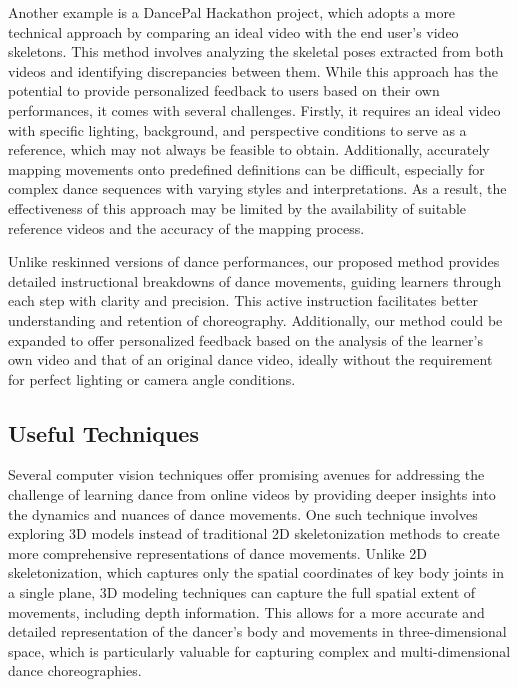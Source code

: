 Another example is a DancePal Hackathon project, which adopts a more technical approach by 
comparing an ideal video with the end user's video skeletons. \cite{Authors14c} This method involves analyzing the 
skeletal poses extracted from both videos and identifying discrepancies between them. While this 
approach has the potential to provide personalized feedback to users based on their own performances, 
it comes with several challenges. Firstly, it requires an ideal video with specific lighting, 
background, and perspective conditions to serve as a reference, which may not always be feasible 
to obtain. Additionally, accurately mapping movements onto predefined definitions can be difficult, 
especially for complex dance sequences with varying styles and interpretations. As a result, the 
effectiveness of this approach may be limited by the availability of suitable reference videos and 
the accuracy of the mapping process.

Unlike reskinned versions of dance performances, our proposed method provides detailed instructional 
breakdowns of dance movements, guiding learners through each step with clarity and precision. This 
active instruction facilitates better understanding and retention of choreography. Additionally, our 
method could be expanded to offer personalized feedback based on the analysis of the learner's own 
video and that of an original dance video, ideally without the requirement for perfect lighting or 
camera angle conditions.


\subsection{Useful Techniques}
Several computer vision techniques offer promising avenues for addressing the challenge of learning 
dance from online videos by providing deeper insights into the dynamics and nuances of dance 
movements. One such technique involves exploring 3D models instead of traditional 2D skeletonization
 methods to create more comprehensive representations of dance movements. Unlike 2D skeletonization, 
 which captures only the spatial coordinates of key body joints in a single plane, 3D modeling 
 techniques can capture the full spatial extent of movements, including depth information. \cite{Alpher03}This 
 allows for a more accurate and detailed representation of the dancer's body and movements in 
 three-dimensional space, which is particularly valuable for capturing complex and multi-dimensional 
 dance choreographies. \cite{Authors14b}

